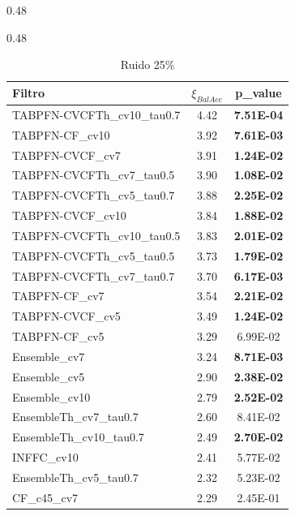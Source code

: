\documentclass[print, color]{ugrTFG}
\begin{document}
\begin{table}[h!]
\begin{subtable}{0.48\textwidth}
\end{subtable}
\hfill
\begin{subtable}{0.48\textwidth}
\centering
\caption{Ruido 25\%}
\begin{tabular}{lcc}
\toprule
Filtro & $\xi_{BalAcc}$ & p\_value \\
\midrule
TABPFN-CVCFTh\_cv10\_tau0.7 & 4.42 & \textbf{7.51E-04} \\
TABPFN-CF\_cv10 & 3.92 & \textbf{7.61E-03} \\
TABPFN-CVCF\_cv7 & 3.91 & \textbf{1.24E-02} \\
TABPFN-CVCFTh\_cv7\_tau0.5 & 3.90 & \textbf{1.08E-02} \\
TABPFN-CVCFTh\_cv5\_tau0.7 & 3.88 & \textbf{2.25E-02} \\
TABPFN-CVCF\_cv10 & 3.84 & \textbf{1.88E-02} \\
TABPFN-CVCFTh\_cv10\_tau0.5 & 3.83 & \textbf{2.01E-02} \\
TABPFN-CVCFTh\_cv5\_tau0.5 & 3.73 & \textbf{1.79E-02} \\
TABPFN-CVCFTh\_cv7\_tau0.7 & 3.70 & \textbf{6.17E-03} \\
TABPFN-CF\_cv7 & 3.54 & \textbf{2.21E-02} \\
TABPFN-CVCF\_cv5 & 3.49 & \textbf{1.24E-02} \\
TABPFN-CF\_cv5 & 3.29 & 6.99E-02 \\
Ensemble\_cv7 & 3.24 & \textbf{8.71E-03} \\
Ensemble\_cv5 & 2.90 & \textbf{2.38E-02} \\
Ensemble\_cv10 & 2.79 & \textbf{2.52E-02} \\
EnsembleTh\_cv7\_tau0.7 & 2.60 & 8.41E-02 \\
EnsembleTh\_cv10\_tau0.7 & 2.49 & \textbf{2.70E-02} \\
INFFC\_cv10 & 2.41 & 5.77E-02 \\
EnsembleTh\_cv5\_tau0.7 & 2.32 & 5.23E-02 \\
CF\_c45\_cv7 & 2.29 & 2.45E-01 \\
\bottomrule
\end{tabular}

\end{subtable}

\vspace{0.8cm}


\end{table}
\end{document}
